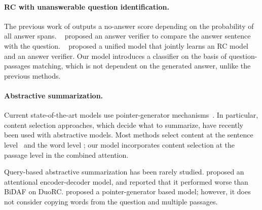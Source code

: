 \documentclass[11pt,a4paper]{article}
\theoremstyle{mydef}
\theoremstyle{myprob}
\begin{document}
\paragraph{RC with unanswerable question identification.}

The previous work of \citep{LevySCZ17,GardnerC18} outputs a no-answer score depending on the probability of all answer spans. \citeauthor{HuWPHYZ18}~ proposed an answer verifier to compare the answer sentence with the question. \citeauthor{SunLQL18}~ proposed a unified model that jointly learns an RC model and an answer verifier. Our model introduces a classifier on the basis of question-passages matching, which is not dependent on the generated answer, unlike the previous methods.

\paragraph{Abstractive summarization.}

Current state-of-the-art models use pointer-generator mechanisms~\citep{%
SeeLM17}.
In particular, content selection approaches, which decide what to summarize, have recently been used with abstractive models. Most methods select content at the sentence level~\citep{HsuLLMTS18,ChenB18} and the word level \citep{PasunuruB18,LiXLG18,GehrmannDR18}; our model incorporates content selection at the passage level in the combined attention. 

Query-based abstractive summarization has been rarely studied. \citet{NemaKLR17} proposed an attentional encoder-decoder model, and \citet{KhapraSSA18} reported that it performed worse than BiDAF %
on DuoRC.
\citet{HasselqvistHK17} proposed a pointer-generator based model; however, it does not consider copying words from the question and multiple passages.

\end{document}
